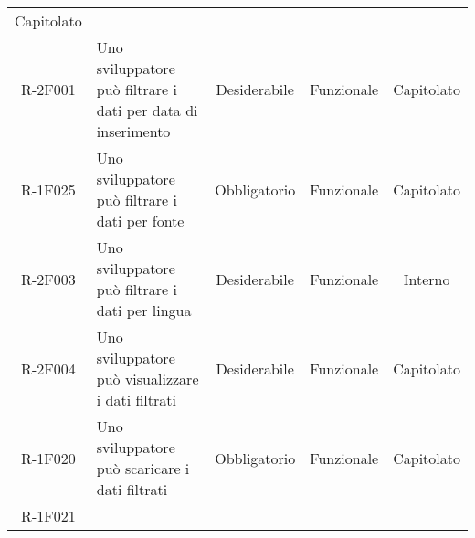 \begin{tabularx}{\textwidth}{cXccc}
Capitolato \\
R-2F001 &

Uno sviluppatore può filtrare i dati per data di inserimento &

Desiderabile &

Funzionale &

Capitolato \\
R-1F025 &

Uno sviluppatore può filtrare i dati per fonte &

Obbligatorio &

Funzionale &

Capitolato \\
R-2F003 &

Uno sviluppatore può filtrare i dati per lingua &

Desiderabile &

Funzionale &

Interno \\
R-2F004 &

Uno sviluppatore può visualizzare i dati filtrati &

Desiderabile &

Funzionale &

Capitolato \\
R-1F020 &

Uno sviluppatore può scaricare i dati filtrati &

Obbligatorio &

Funzionale &

Capitolato \\
R-1F021 &


\end{tabularx}
